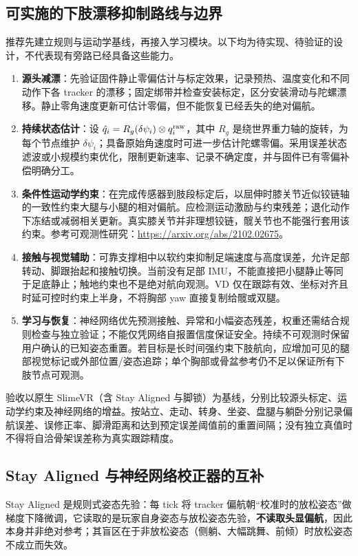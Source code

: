 \documentclass[scheme=plain,UTF8,11pt,a4paper]{ctexart}
\begin{document}
\subsection{可实施的下肢漂移抑制路线与边界}
\label{subsec:heading_solution}
推荐先建立规则与运动学基线，再接入学习模块。以下均为待实现、待验证的设计，不代表现有旁路已经具备这些能力。
\begin{enumerate}
    \item \textbf{源头减漂}：先验证固件静止零偏估计与标定效果，记录预热、温度变化和不同动作下各 tracker 的漂移；固定绑带并检查安装标定，区分安装滑动与陀螺漂移。静止零角速度更新可估计零偏，但不能恢复已经丢失的绝对偏航。
    \item \textbf{持续状态估计}：设 $\hat q_i = R_g(\delta\psi_i)\otimes q_i^{\rm raw}$，其中 $R_g$ 是绕世界重力轴的旋转，为每个节点维护 $\delta\psi_i$；具备原始角速度时可进一步估计陀螺零偏。采用误差状态滤波或小规模约束优化，限制更新速率、记录不确定度，并与固件已有零偏补偿明确分工。
    \item \textbf{条件性运动学约束}：在完成传感器到肢段标定后，以屈伸时膝关节近似铰链轴的一致性约束大腿与小腿的相对偏航。应检测运动激励与约束残差；退化动作下冻结或减弱相关更新。真实膝关节并非理想铰链，髋关节也不能强行套用该约束。参考可观测性研究：\url{https://arxiv.org/abs/2102.02675}。
    \item \textbf{接触与视觉辅助}：可靠支撑相中以软约束抑制足端速度与高度误差，允许足部转动、脚跟抬起和接触切换。当前没有足部 IMU，不能直接把小腿静止等同于足底静止；触地约束也不是绝对航向观测。VD 仅在跟踪有效、坐标对齐且时延可控时约束上半身，不将胸部 yaw 直接复制给髋或双腿。
    \item \textbf{学习与恢复}：神经网络优先预测接触、异常和小幅姿态残差，权重还需结合规则检查与独立验证；不能仅凭网络自报置信度保证安全。持续不可观测时保留用户确认的已知姿态重置。若目标是长时间强约束下肢航向，应增加可见的腿部视觉标记或外部位置/姿态追踪；单个胸部或骨盆参考仍不足以保证所有下肢节点可观测。
\end{enumerate}
验收以原生 SlimeVR（含 Stay Aligned 与脚锁）为基线，分别比较源头标定、运动学约束及神经网络的增益。按站立、走动、转身、坐姿、盘腿与躺卧分别记录偏航误差、误修正率、脚滑距离和达到预定误差阈值前的重置间隔；没有独立真值时不得将自洽骨架误差称为真实跟踪精度。

\subsection{Stay Aligned 与神经网络校正器的互补}

Stay Aligned 是规则式姿态先验：每 tick 将 tracker 偏航朝“校准时的放松姿态”做梯度下降微调，它读取的是玩家自身姿态与放松姿态先验，\textbf{不读取头显偏航}，因此本身并非绝对参考；其盲区在于非放松姿态（侧躺、大幅跳舞、前倾）时放松姿态不成立而失效。
\end{document}
